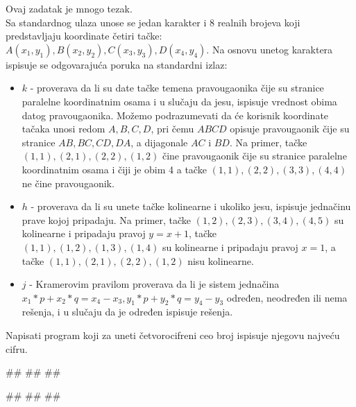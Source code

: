 \begin{Exercise}[label=v1.2_14] 
Ovaj zadatak je mnogo tezak.\\
Sa standardnog ulaza unose se jedan karakter i 8 realnih brojeva koji predstavljaju 
koordinate četiri tačke: $A(x_1, y_1), B(x_2, y_2), C(x_3, y_3), D(x_4, y_4)$. Na osnovu unetog karaktera 
ispisuje se odgovarajuća poruka na standardni izlaz:
\begin{itemize}
\item{$k$ - proverava da li su date tačke temena pravougaonika čije su stranice paralelne koordinatnim osama i 
    u slučaju da jesu, ispisuje vrednost obima datog pravougaonika. Možemo podrazumevati da će korisnik koordinate tačaka 
    unosi redom $A,B,C,D$, pri čemu $ABCD$ opisuje pravougaonik čije su stranice $AB,BC,CD,DA$, a dijagonale $AC$ i $BD$. 
    Na primer, tačke $(1,1),(2,1),(2,2),(1,2)$ čine pravougaonik čije su stranice paralelne koordinatnim osama i čiji je obim 4
    a tačke $(1,1),(2,2),(3,3),(4,4)$ ne čine pravougaonik.}
\item{$h$ - proverava da li su unete tačke kolinearne i ukoliko jesu, ispisuje jednačinu prave kojoj pripadaju. 
    Na primer, tačke $(1,2),(2,3),(3,4),(4,5)$ su kolinearne i pripadaju pravoj $y=x+1$, 
    tačke $(1,1),(1,2),(1,3),(1,4)$ su kolinearne i pripadaju pravoj $x=1$,
    a tačke $(1,1),(2,1),(2,2),(1,2)$ nisu kolinearne.}
\item{$j$ - Kramerovim pravilom proverava da li je sistem jednačina
$x_1 * p + x_2 * q = x_4 - x_3,y_1 * p + y_2 * q = y_4 - y_3$
    određen, neodređen ili nema rešenja, i u slučaju da je određen ispisuje rešenja.}
\end{itemize} 
\end{Exercise}
\begin{Answer}[ref=v1.2_14]
\end{Answer}


\begin{Exercise}[label=p1.2_] 
Napisati program koji za uneti četvorocifreni ceo broj
 ispisuje njegovu najveću cifru. \\
\begin{miditest}
\begin{upotreba}{1}
#\naslovInt#
##
##
\end{upotreba}
\end{miditest}
\begin{miditest}
\begin{upotreba}{2}
#\naslovInt#
##
##
\end{upotreba}
\end{miditest}
\end{Exercise}
\begin{Answer}[ref=p1.2_]
\end{Answer}

